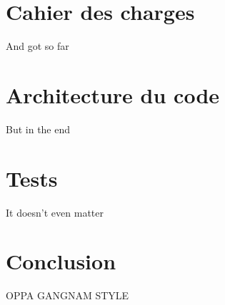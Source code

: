 \documentclass[a4paper]{article}
\begin{document}
\section{Cahier des charges}

And got so far

\section{Architecture du code}

But in the end

\section{Tests}

It doesn't even matter

\section{Conclusion}

OPPA GANGNAM STYLE

\end{document}
